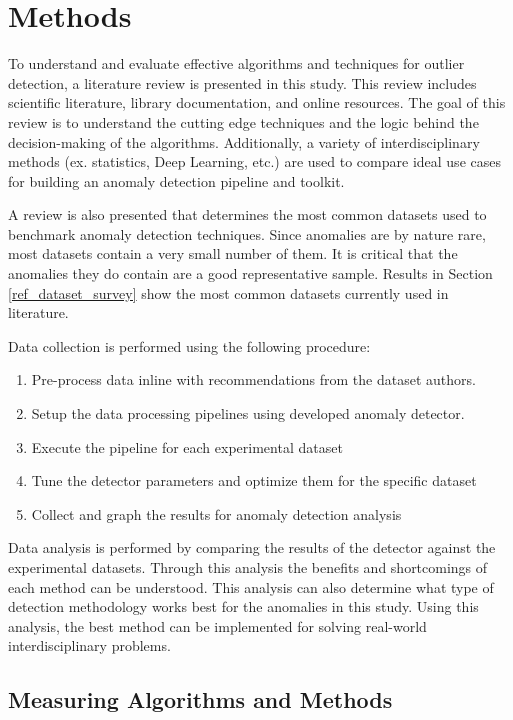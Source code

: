\section{Methods}
\label{ref_methods}

To understand and evaluate effective algorithms and techniques for outlier detection, a literature review is presented in this study. This review includes scientific literature, library documentation, and online resources. The goal of this review is to understand the cutting edge techniques and the logic behind the decision-making of the algorithms. Additionally, a variety of interdisciplinary methods (ex. statistics, Deep Learning, etc.) are used to compare ideal use cases for building an anomaly detection pipeline and toolkit.

A review is also presented that determines the most common datasets used to benchmark anomaly detection techniques. Since anomalies are by nature rare, most datasets contain a very small number of them. It is critical that the anomalies they do contain are a good representative sample. Results in Section \ref{ref_dataset_survey} show the most common datasets currently used in literature.

Data collection is performed using the following procedure:
\begin{enumerate}
    \item Pre-process data inline with recommendations from the dataset authors.
    \item Setup the data processing pipelines using developed anomaly detector.
    \item Execute the pipeline for each experimental dataset
    \item Tune the detector parameters and optimize them for the specific dataset
    \item Collect and graph the results for anomaly detection analysis
\end{enumerate}

Data analysis is performed by comparing the results of the detector against the experimental datasets. Through this analysis the benefits and shortcomings of each method can be understood. This analysis can also determine what type of detection methodology works best for the anomalies in this study. Using this analysis, the best method can be implemented for solving real-world interdisciplinary problems.

\subsection{Measuring Algorithms and Methods}

